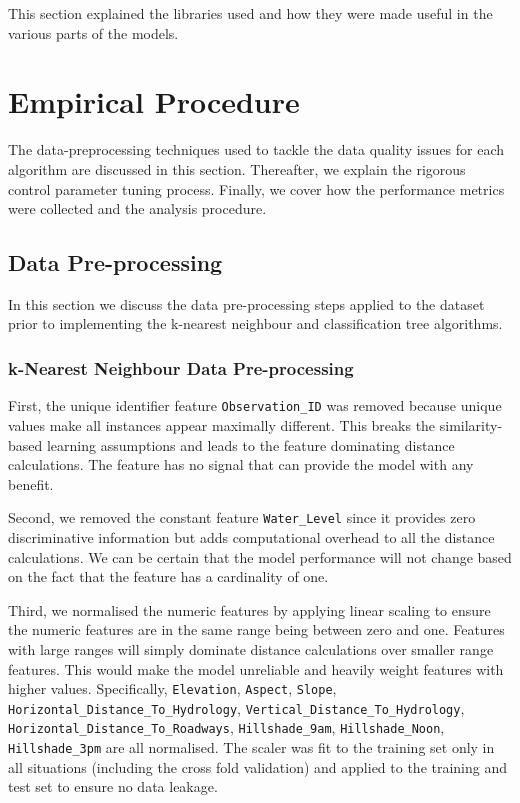 \documentclass[10pt, conference]{IEEEtran}
\begin{document}
This section explained the libraries used and how they were made useful in the various parts of the models.


\section{Empirical Procedure}
The data-preprocessing techniques used to tackle the data quality issues for each algorithm are discussed in this section. Thereafter, we explain the rigorous control parameter tuning process. Finally, we cover how the performance metrics were collected and the analysis procedure.
\subsection{Data Pre-processing}
In this section we discuss the data pre-processing steps applied to the dataset prior to implementing the k-nearest neighbour and classification tree algorithms.
\subsubsection{k-Nearest Neighbour Data Pre-processing}
First, the unique identifier feature \texttt{Observation\_ID} was removed because unique values make all instances appear maximally different. This breaks the similarity-based learning assumptions and leads to the feature dominating distance calculations. The feature has no signal that can provide the model with any benefit.

Second, we removed the constant feature \texttt{Water\_Level} since it provides zero discriminative information but adds computational overhead to all the distance calculations. We can be certain that the model performance will not change based on the fact that the feature has a cardinality of one.

Third, we normalised the numeric features by applying linear scaling to ensure the numeric features are in the same range being between zero and one. Features with large ranges will simply dominate distance calculations over smaller range features. This would make the model unreliable and heavily weight features with higher values. Specifically, \texttt{Elevation}, \texttt{Aspect}, \texttt{Slope}, \texttt{Horizontal\_Distance\_To\_Hydrology}, \texttt{Vertical\_Distance\_To\_Hydrology}, \texttt{Horizontal\_Distance\_To\_Roadways}, \texttt{Hillshade\_9am}, \texttt{Hillshade\_Noon}, \texttt{Hillshade\_3pm}
 are all normalised. The scaler was fit to the training set only in all situations (including the cross fold validation) and applied to the training and test set to ensure no data leakage.
 
\end{document}
